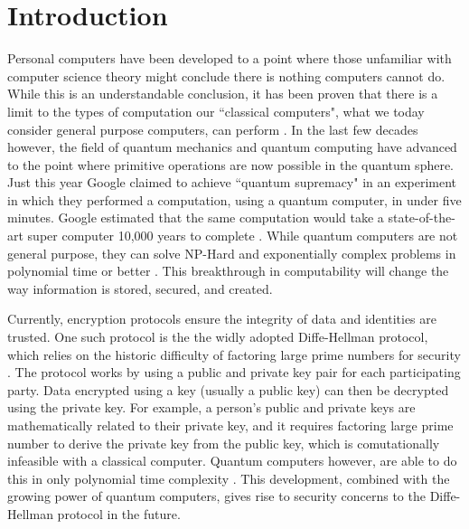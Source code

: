 \chapter{Introduction}
\label{chap:introduction}

Personal computers have been developed to a point where those unfamiliar with computer science theory might conclude there is nothing computers cannot do.
While this is an understandable conclusion, it has been proven that there is a limit to the types of computation our ``classical computers", what we today consider general purpose computers, can perform \cite{linz}.
In the last few decades however, the field of quantum mechanics and quantum computing have advanced to the point where primitive operations are now possible in the quantum sphere.
Just this year Google claimed to achieve ``quantum supremacy" in an experiment in which they performed a computation, using a quantum computer, in under five minutes. 
Google estimated that the same computation would take a state-of-the-art super computer 10,000 years to complete \cite{quantum_supremacy}. 
While quantum computers are not general purpose, they can solve NP-Hard and exponentially complex problems in polynomial time or better \cite{TODO}.
This breakthrough in computability will change the way information is stored, secured, and created.


Currently, encryption protocols ensure the integrity of data and identities are trusted.
One such protocol is the the widly adopted Diffe-Hellman protocol, which relies on the historic difficulty of factoring large prime numbers for security \cite{qc:agi}.
The protocol works by using a public and private key pair for each participating party.
Data encrypted using a key (usually a public key) can then be decrypted using the private key.
For example, a person's public and private keys are mathematically related to their private key, and it requires factoring large prime number to derive the private key from the public key, which is comutationally infeasible with a classical computer.
Quantum computers however, are able to do this in only polynomial time complexity \cite{doi:10.1137/S0036144598347011}.
This development, combined with the growing power of quantum computers, gives rise to security concerns to the Diffe-Hellman protocol in the future.

